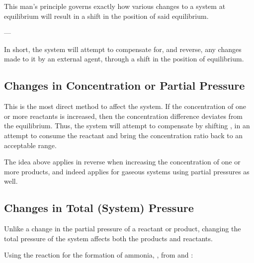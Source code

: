 			This man's principle governs exactly how various changes to a system at equilibrium will result in a shift in the position of
			said equilibrium.


			--- 

			In short, the system will attempt to compensate for, and reverse, any changes made to it by an external agent, through a shift
			in the position of equilibrium.



		\subsection{Changes in Concentration or Partial Pressure}

			This is the most direct method to affect the system. If the concentration of one or more reactants is increased, then the
			concentration difference deviates from the equilibrium. Thus, the system will attempt to compensate by shifting ,
			in an attempt to consume the reactant and bring the concentration ratio back to an acceptable range.

			The idea above applies in reverse when increasing the concentration of one or more products, and indeed applies for gaseous
			systems using partial pressures as well.




		\subsection{Changes in Total (System) Pressure}

			Unlike a change in the partial pressure of a reactant or product, changing the total pressure of the system affects both
			the products and reactants.

			Using the reaction for the formation of ammonia, , from  and :


